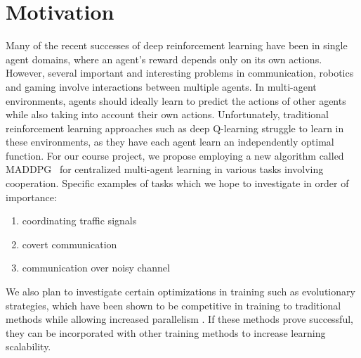 
\section{Motivation}
\label{sec:motivation}

Many of the recent successes of deep reinforcement learning have been in
single agent domains, where an agent's reward depends only on its own actions.
However, several important and interesting problems in communication, robotics
and gaming involve interactions between multiple agents. In multi-agent
environments, agents should ideally learn to predict the actions of other
agents while also taking into account their own actions. Unfortunately, traditional
reinforcement learning approaches such as deep Q-learning struggle to learn in
these environments, as they have each agent learn an independently optimal
function. For our course project, we propose employing a new algorithm called
MADDPG~\cite{lowe2017multi} for centralized multi-agent learning in various
tasks involving cooperation.
Specific examples of tasks which we hope to investigate in order of importance:
\begin{enumerate}
  \item coordinating traffic signals
  \item covert communication
  \item communication over noisy channel
\end{enumerate}

We also plan to investigate certain optimizations in training such as evolutionary strategies, which have been shown to be competitive in training to traditional methods while allowing increased parallelism \cite{salimans2017evolution}.
If these methods prove successful, they can be incorporated with other training methods to increase learning scalability.
